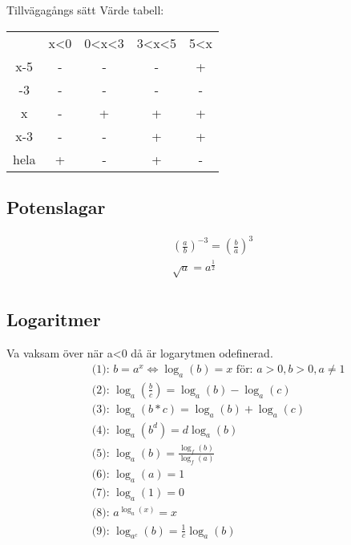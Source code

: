 \begin{multicols}{2}
\begin{exampleblock}{Tillvägagångs sätt}
Värde tabell:
\begin{center}
\begin{tabular}{ |c|c|c|c|c| } 
 \hline
        & x<0   & 0<x<3 & 3<x<5 & 5<x   \\ 
 x-5    & -     & -     & -     & +     \\ 
 -3     & -     & -     & -     & -     \\  
 x      & -     & +     & +     & +     \\ 
 x-3    & -     & -     & +     & +     \\ 
 hela   & +     & -     & +     & -     \\ 
 \hline
\end{tabular}
\end{center}
\end{exampleblock}


\subsection{Potenslagar}
\begin{align*}
  &(\frac{a}{b})^{-3} = (\frac{b}{a})^{3}\\
  &\sqrt{a} = a^{\frac{1}{2}} \\
\end{align*}


\subsection{Logaritmer}
Va vaksam över när a<0 då är logarytmen odefinerad. 
\begin{align*}
  &\quad \text{(1): } b = a^x \Leftrightarrow \log_a(b) = x  \text{ för: } a>0, b>0, a \ne 1  \\
  &\quad \text{(2): } \log_a(\frac{b}{c}) = \log_a(b) - \log_a(c) \\
  &\quad \text{(3): } \log_a(b*c) = \log_a(b) + \log_a(c) \\
  &\quad \text{(4): } \log_a(b^d) = d\log_a(b) \\
  &\quad \text{(5): } \log_a(b) = \frac{\log_f(b)}{\log_f(a)} \\
  &\quad \text{(6): } \log_a(a) = 1 \\
  &\quad \text{(7): } \log_a(1) = 0 \\
  &\quad \text{(8): } a^{\log_a(x)} = x \\
  &\quad \text{(9): } \log_{a^c}(b) = \frac{1}{c} \log_a(b) \\
\end{align*}


\end{multicols}
